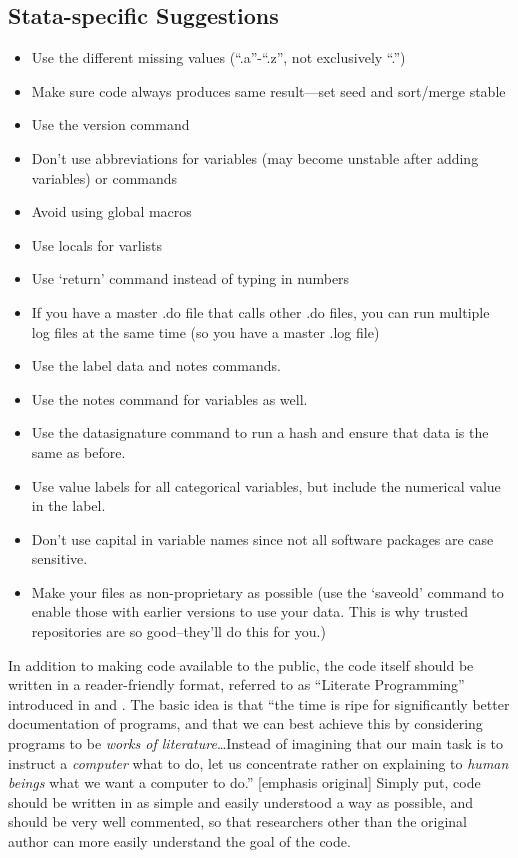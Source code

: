 \documentclass[12pt] {article}
\begin{document}
\subsection{Stata-specific
Suggestions}\label{stata-specific-suggestions}

\begin{itemize}
\item
  Use the different missing values (``.a''-``.z'', not exclusively
  ``.'')
\item
  Make sure code always produces same result---set seed and sort/merge
  stable
\item
  Use the version command
\item
  Don't use abbreviations for variables (may become unstable after
  adding variables) or commands
\item
  Avoid using global macros
\item
  Use locals for varlists
\item
  Use `return' command instead of typing in numbers
\item
  If you have a master .do file that calls other .do files, you can run
  multiple log files at the same time (so you have a master .log file)
\item
  Use the label data and notes commands.
\item
  Use the notes command for variables as well.
\item
  Use the datasignature command to run a hash and ensure that data is
  the same as before.
\item
  Use value labels for all categorical variables, but include the
  numerical value in the label.
\item
  Don't use capital in variable names since not all software packages
  are case sensitive.
\item
  Make your files as non-proprietary as possible (use the `saveold'
  command to enable those with earlier versions to use your data. This
  is why trusted repositories are so good--they'll do this for you.)
\end{itemize}

In addition to making code available to the public, the code itself
should be written in a reader-friendly format, referred to as ``Literate
Programming'' introduced in \cite{knuth_literate_1984} and \cite{knuth_literate_1992}. The basic
idea is that ``the time is ripe for significantly better documentation
of programs, and that we can best achieve this by considering programs
to be \emph{works of literature}\ldots{}Instead of imagining that our
main task is to instruct a \emph{computer} what to do, let us
concentrate rather on explaining to \emph{human beings} what we want a
computer to do.'' {[}emphasis original{]} Simply put, code should be
written in as simple and easily understood a way as possible, and should
be very well commented, so that researchers other than the original
author can more easily understand the goal of the code.
\end{document}
